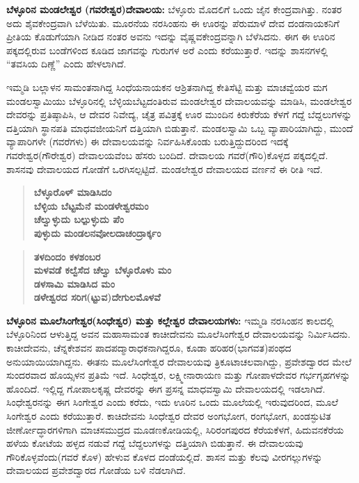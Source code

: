 \textbf{ಬೆಳ್ಳೂರಿನ ಮಂಡಲೇಶ್ವರ (ಗವರೇಶ್ವರ)ದೇವಾಲಯ:} ಬೆಳ್ಳೂರು ಮೊದಲಿಗೆ ಒಂದು ಜೈನ ಕೇಂದ್ರವಾಗಿತ್ತು. ನಂತರ ಅದು ಶೈವಕೇಂದ್ರವಾಗಿ ಬೆಳೆಯಿತು. ಮೂರನೆಯ ನರಸಿಂಹನು ಈ ಊರನ್ನು ಪೆರುಮಾಳೆ ದೇವ ದಂಡನಾಯಕನಿಗೆ ಪ್ರೀತಿಯ ಕೊಡುಗೆಯಾಗಿ ನೀಡಿದ ನಂತರ ಅವನು ಇದನ್ನು ವೈಷ್ಣವಕೇಂದ್ರವನ್ನಾಗಿ ಬೆಳೆಸಿದನು. ಈಗ ಈ ಊರಿನ ಪಕ್ಕದಲ್ಲಿರುವ ಬಂಡೆಗಳಿಂದ ಕೂಡಿದ ಜಾಗವನ್ನು ಗುರುಗಳ ಅರೆ ಎಂದು ಕರೆಯುತ್ತಾರೆ. ಇದನ್ನು ಶಾಸನಗಳಲ್ಲಿ “ತವಸಿಯ ದಿಣ್ಣೆ” ಎಂದು ಹೇಳಲಾಗಿದೆ. 

ಇಮ್ಮಡಿ ಬಲ್ಲಾಳನ ಸಾಮಂತನಾಗಿದ್ದ ಸಿಂಧೆಯನಾಯಕನ ಆಶ್ರಿತನಾಗಿದ್ದ ಕೇತಿಸೆಟ್ಟಿ ಮತ್ತು ಮಾಚವ್ವೆಯರ ಮಗ ಮಂಡಲಸ್ವಾಮಿಯು ಬೆಳ್ಳೂರಿನಲ್ಲಿ ಬೆಳ್ಳಿಯಬೆಟ್ಟದಂತಿರುವ ಮಂಡಲೇಶ್ವರ ದೇವಾಲಯವನ್ನು ಮಾಡಿಸಿ, ಮಂಡಲೇಶ್ವರ ದೇವರನ್ನು ಪ್ರತಿಷ್ಠಾಪಿಸಿ, ಆ ದೇವರ ನಿವೇದ್ಯ, ಚೈತ್ರ ಪವಿತ್ರಕ್ಕೆ ಊರ ಮುಂದಿನ ಕಿರುಕೆರೆಯ ಕೆಳಗೆ ಗದ್ದೆ ಬೆದ್ದಲುಗಳನ್ನು ದತ್ತಿಯಾಗಿ ಸ್ಥಾನಪತಿ ಮಾಧವಜೀಯನಿಗೆ ದತ್ತಿಯಾಗಿ ಬಿಡುತ್ತಾನೆ. ಮಂಡಲಸ್ವಾಮಿ ಒಬ್ಬ ವ್ಯಾಪಾರಿಯಾಗಿದ್ದು, ಮುಂದೆ ವ್ಯಾಪಾರಿಗಳೇ (ಗವರೆಗಳು) ಈ ದೇವಾಲಯವನ್ನು ನಿರ್ವಹಿಸಿಕೊಂಡು ಬರುತ್ತಿದ್ದುದರಿಂದ ಇದಕ್ಕೆ ಗವರೇಶ್ವರ(ಗೌರೇಶ್ವರ) ದೇವಾಲಯವೆಂಬ ಹೆಸರು ಬಂದಿದೆ. ದೇವಾಲಯ ಗವರೆ(ಗೌರಿ)ಕೊಳ್ಳದ ಪಕ್ಕದಲ್ಲಿದೆ. ಶಾಸನವು ದೇವಾಲಯದ ಗೋಡೆಗೆ ಒರಗಿಸಲ್ಪಟ್ಟಿದೆ. ಮಂಡಲೇಶ್ವರ ದೇವಾಲಯದ ವರ್ಣನೆ ಈ ರೀತಿ ಇದೆ.

\begin{verse}
\textbf{ಬೆಳ್ಳೂರೊಳ್​ ಮಾಡಿಸಿದಂ} \\\textbf{ಬೆಳ್ಳಿಯ ಬೆಟ್ಟಮೆನೆ ಮಂಡಳೇಶ್ವರಮಂ} \\\textbf{ಚೆಲ್ವುಳ್ಳುದು ಬಲ್ಪುಳ್ಳುದು ಪೆಂ} \\\textbf{ಪುಳ್ಳುದು ಮಂಡಲನವೋಲದಾಚಂದ್ರಾರ್ಕ್ಕಂ}
\end{verse}

\begin{verse}
\textbf{ತಳದಿಂದಂ ಕಳಶಂಬರ} \\\textbf{ಮಳವಡೆ ಕಲ್ವೆಸೆದ ಚೆಲ್ವು ಬೆಳ್ಳೂರೊಳು ಮಂ} \\\textbf{ಡಳಸಾಮಿ ಮಾಡಿಸಿದ ಮಂ} \\\textbf{ಡಳೇಶ್ವರದ ಸರಿಗ(ಟ್ಟುವ)ದೇಗುಲಮೊಳವೆ}
\end{verse}

\textbf{ಬೆಳ್ಳೂರಿನ ಮೂಲೆಸಿಂಗೇಶ್ವರ(ಸಿಂಧೇಶ್ವರ) ಮತ್ತು ಕಲ್ಲೇಶ್ವರ ದೇವಾಲಯಗಳು:} ಇಮ್ಮಡಿ ನರಸಿಂಹನ ಕಾಲದಲ್ಲಿ ಬೆಳ್ಳೂರಿನಿಂದ ಆಳುತ್ತಿದ್ದ ಅವನ ಮಹಾಸಾಮಂತ ಕಾಚೀದೇವನು ಮೂಲೆಸಿಂಗೇಶ್ವರ ದೇವಾಲಯವನ್ನು ನಿರ್ಮಿಸಿದನು. ಕಾಚೀದೇವನು, ಚೆನ್ನಕೇಶವನ ಪಾದಪದ್ಮಾರಾಧಕನಾಗಿದ್ದರೂ, ಕೂಡಾ ಹರಿಹರ(ಭಾಗವತ)ಪಂಥದ ಅನುಯಾಯಿಯಾಗಿದ್ದನು. ಈತನು ಮೂಲೆಸಿಂಗೇಶ್ವರ ದೇವಾಲಯವು ತ್ರಿಕೂಟಾಚಲವಾಗಿದ್ದು, ಪ್ರವೇಶದ್ವಾರದ ಮೇಲೆ ಸುಂದರವಾದ ಹೊಯ್ಸಳನ ಪ್ರತಿಮೆ ಇದೆ. ಸಿಂಧೇಶ್ವರ, ಲಕ್ಷ್ಮೀನಾರಾಯಣ ಮತ್ತು ಗೋಪಾಳದೇವರ ಗರ್ಭಗೃಹಗಳನ್ನು ಹೊಂದಿದೆ. ಇಲ್ಲಿದ್ದ ಗೋಪಾಲಕೃಷ್ಣ ದೇವರನ್ನು ಈಗ ಪ್ರಸನ್ನ ಮಾಧವಸ್ವಾಮಿ ದೇವಾಲಯದಲ್ಲಿ ಇಡಲಾಗಿದೆ. ಸಿಂಧೇಶ್ವರನನ್ನು ಈಗ ಸಿಂಗೇಶ್ವರ ಎಂದು ಕರೆದು, ಇದು ಊರಿನ ಒಂದು ಮೂಲೆಯಲ್ಲಿ ಇರುವುದರಿಂದ, ಮೂಲೆ ಸಿಂಗೇಶ್ವರ ಎಂದು ಕರೆಯುತ್ತಾರೆ. ಕಾಚಿದೇವನು ಸಿಂಧೇಶ್ವರ ದೇವರ ಅಂಗಭೋಗ, ರಂಗಭೋಗ, ಖಂಡಸ್ಫುಟಿತ ಜೀರ್ಣೋದ್ಧಾರಗಳಿಗಾಗಿ ಮಾಚಸಮುದ್ರದ ಮೂಡಣಕೋಡಿಯಲ್ಲಿ, ಸಿರಿರಂಗಪುರದ ಕೆರೆಯಕೆಳಗೆ, ಹಿದುವನಕೆರೆಯ ಹಳೆಯ ಕೋಟೆಯ ಹಳ್ಳದ ನಡುವೆ ಗದ್ದೆ ಬೆದ್ದಲುಗಳನ್ನು ದತ್ತಿಯಾಗಿ ಬಿಡುತ್ತಾನೆ. ಈ ದೇವಾಲಯವು ಗೌರಿಕೊಳ್ಳವೆಂದು(ಗವರೆ ಕೊಳ) ಹೇಳುವ ಕೊಳದ ದಂಡೆಯಲ್ಲಿದೆ. ಶಾಸನ ಮತ್ತು ಕೆಲವು ವೀರಗಲ್ಲುಗಳನ್ನು ದೇವಾಲಯದ ಪ್ರವೇಶದ್ವಾರದ ಗೋಡೆಯ ಬಳಿ ನೆಡಲಾಗಿದೆ.

